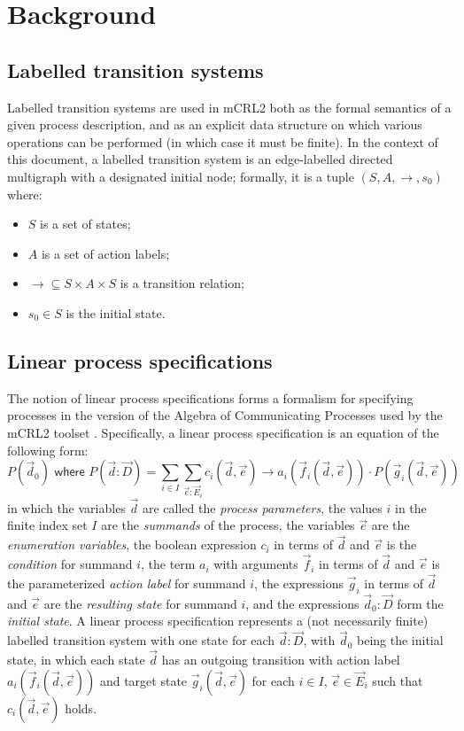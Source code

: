 \documentclass[a4paper]{article}
\begin{document}
\section{Background}
\label{sec:background}
\subsection{Labelled transition systems}
\label{sec:background/labelled-transition-systems}
Labelled transition systems are used in mCRL2 both as the formal semantics of a given process description, and as an explicit data structure on which various operations can be performed (in which case it must be finite). In the context of this document, a labelled transition system is an edge-labelled directed multigraph with a designated initial node; formally, it is a tuple $(S, A, \rightarrow, s_0)$ \cite{mcrl2lts} where:
\begin{itemize}
 \item $S$ is a set of states;
 \item $A$ is a set of action labels;
 \item $\rightarrow \subseteq S \times A \times S$ is a transition relation;
 \item $s_0 \in S$ is the initial state.
\end{itemize}

\subsection{Linear process specifications}
\label{sec:background/linear-process-specifications}
The notion of linear process specifications forms a formalism for specifying processes in the version of the Algebra of Communicating Processes used by the mCRL2 toolset \cite{mcrl2language}. Specifically, a linear process specification is an equation of the following form:
$$ P(\vec{d}_0) \textsf{ where } P(\vec{d} : \vec{D}) = \sum_{i \in I} \sum_{\vec{e} : \vec{E}_i} c_i(\vec{d}, \vec{e}) \rightarrow a_i(\vec{f}_i(\vec{d}, \vec{e})) \cdot P(\vec{g}_i(\vec{d}, \vec{e})) $$
in which the variables $\vec{d}$ are called the \textit{process parameters}, the values $i$ in the finite index set $I$ are the \textit{summands} of the process, the variables $\vec{e}$ are the \textit{enumeration variables}, the boolean expression $c_i$ in terms of $\vec{d}$ and $\vec{e}$ is the \textit{condition} for summand $i$, the term $a_i$ with arguments $\vec{f}_i$ in terms of $\vec{d}$ and $\vec{e}$ is the parameterized \textit{action label} for summand $i$, the expressions $\vec{g}_i$ in terms of $\vec{d}$ and $\vec{e}$ are the \textit{resulting state} for summand $i$, and the expressions $\vec{d}_0 : \vec{D}$ form the \textit{initial state}. A linear process specification represents a (not necessarily finite) labelled transition system with one state for each $\vec{d} : \vec{D}$, with $\vec{d}_0$ being the initial state, in which each state $\vec{d}$ has an outgoing transition with action label $a_i(\vec{f}_i(\vec{d}, \vec{e}))$ and target state $\vec{g}_i(\vec{d}, \vec{e})$ for each $i \in I$, $\vec{e} \in \vec{E}_i$ such that $c_i(\vec{d}, \vec{e})$ holds.
\end{document}
